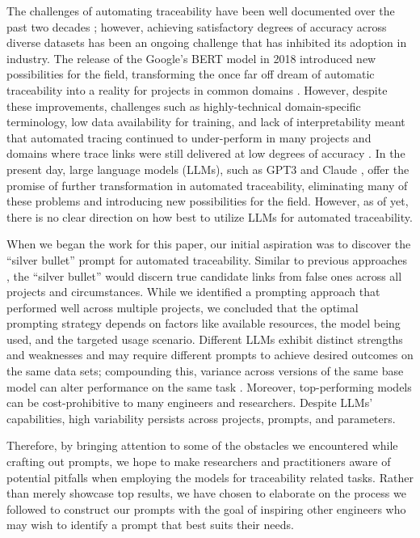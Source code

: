 The challenges of automating traceability have been well documented over the past two decades \cite{traceability_vsm,cm1,DBLP:books/daglib/p/LuciaMOP12,rath2018traceability}; however, achieving satisfactory degrees of accuracy across diverse datasets has been an ongoing challenge \cite{DBLP:conf/icse/Cleland-HuangGHMZ14,traceability_nn} that has inhibited its adoption in industry. The release of the Google's BERT model \cite{BERT} in 2018 introduced new possibilities for the field, transforming the once far off dream of automatic traceability into a reality for projects in common domains  \cite{bert_pl,bert_nl}. However, despite these improvements,  challenges such as highly-technical domain-specific terminology, low data availability for training, and lack of interpretability meant that automated tracing continued to under-perform in many projects and domains where trace links were still delivered at low degrees of accuracy \cite{MARO201885, DBLP:journals/computer/Cleland-HuangBCSR07}. In the present day, large language models (LLMs), such as GPT3 and Claude \cite{gpt3, claude}, offer the promise of further transformation in automated traceability, eliminating many of these problems and introducing new possibilities for the field. However, as of yet, there is no clear direction on how best to utilize LLMs for automated traceability. 

When we began the work for this paper, our initial aspiration was to discover the ``silver bullet'' prompt for automated traceability. Similar to previous approaches \cite{traceability_vsm, bert_nl, bert_pl}, the ``silver bullet'' would discern true candidate links from false ones across all projects and circumstances. While we identified a prompting approach that performed well across multiple projects, we concluded that the optimal prompting strategy depends on factors like available resources, the model being used, and the targeted usage scenario. Different LLMs exhibit distinct strengths and weaknesses and may require different prompts to achieve desired outcomes on the same data sets; compounding this, variance across versions of the same base model can alter performance on the same task \cite{chen_how_2023}. Moreover, top-performing models can be cost-prohibitive to many engineers and researchers. Despite LLMs’ capabilities, high variability persists across projects, prompts, and parameters. 

Therefore, by bringing attention to some of the obstacles we encountered while crafting out prompts, we hope to make researchers and practitioners aware of potential pitfalls when employing the models for traceability related tasks. Rather than merely showcase top results, we have chosen to elaborate on the process we followed to construct our prompts with the goal of inspiring other engineers who may wish to identify a prompt that best suits their needs.

